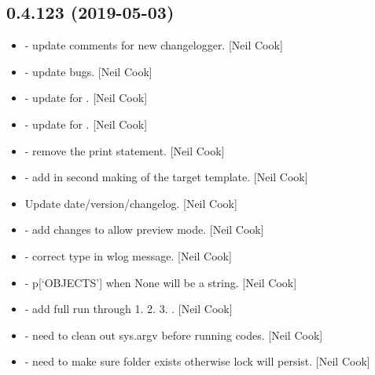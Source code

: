 \documentclass[a4paper,10pt,english]{report}
\begin{document}
\subsection{0.4.123 (2019-05-03)}
\label{\detokenize{misc/changelog:id138}}\begin{itemize}
\item {} 
 - update comments for new changelogger. {[}Neil Cook{]}

\item {} 
 - update bugs. {[}Neil Cook{]}

\item {} 
 - update for . {[}Neil Cook{]}

\item {} 
 - update for . {[}Neil Cook{]}

\item {} 
 - remove the print statement. {[}Neil Cook{]}

\item {} 
 - add in second making of the target template.
{[}Neil Cook{]}

\item {} 
Update date/version/changelog. {[}Neil Cook{]}

\item {} 
 - add changes to allow preview mode. {[}Neil Cook{]}

\item {} 
 - correct type in wlog message. {[}Neil Cook{]}

\item {} 
 - p{[}‘OBJECTS’{]} when None will be a string. {[}Neil
Cook{]}

\item {} 
 - add full run through 1.  2. 
3. . {[}Neil Cook{]}

\item {} 
 - need to clean out sys.argv before running codes.
{[}Neil Cook{]}

\item {} 
 - need to make sure folder exists otherwise lock will
persist. {[}Neil Cook{]}


\end{itemize}
\end{document}
